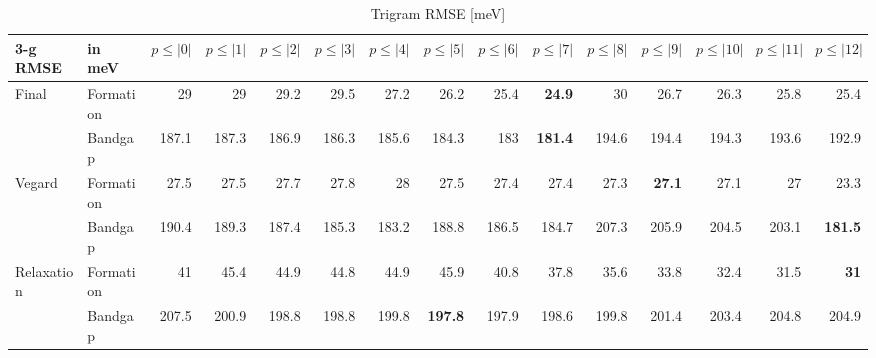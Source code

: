 \documentclass[11pt,oneside,czech,american]{book} %
\theoremstyle{definition} %
\theoremstyle{definition}
\begin{document}
\begin{table}[H]
	\scriptsize
	\centering
\begin{tabular}{llrrrrrrrrrrrrr}
	\hline
	3-g RMSE   & in meV    &   $p{\leq}|0|$ &   $p{\leq}|1|$ &   $p{\leq}|2|$ &   $p{\leq}|3|$ &   $p{\leq}|4|$ &   $p{\leq}|5|$ &   $p{\leq}|6|$ &   $p{\leq}|7|$ &   $p{\leq}|8|$ &   $p{\leq}|9|$ &   $p{\leq}|10|$ &   $p{\leq}|11|$ &   $p{\leq}|12|$ \\
	\hline
	\multirow{2}{*}{Final}      & Formation &       29   &       29   &       29.2 &       29.5 &       27.2 &       26.2 &       25.4 &       \textbf{24.9} &       30   &       26.7 &        26.3 &        25.8 &        25.4 \\
	      & Bandgap   &      187.1 &      187.3 &      186.9 &      186.3 &      185.6 &      184.3 &      183   &      \textbf{181.4} &      194.6 &      194.4 &       194.3 &       193.6 &       192.9 \\
	\multirow{2}{*}{Vegard}     & Formation &       27.5 &       27.5 &       27.7 &       27.8 &       28   &       27.5 &       27.4 &       27.4 &       27.3 &       \textbf{27.1} &        27.1 &        27   &        23.3 \\
	     & Bandgap   &      190.4 &      189.3 &      187.4 &      185.3 &      183.2 &      188.8 &      186.5 &      184.7 &      207.3 &      205.9 &       204.5 &       203.1 &       \textbf{181.5} \\
	\multirow{2}{*}{Relaxation} & Formation &       41   &       45.4 &       44.9 &       44.8 &       44.9 &       45.9 &       40.8 &       37.8 &       35.6 &       33.8 &        32.4 &        31.5 &        \textbf{31}   \\
	 & Bandgap   &      207.5 &      200.9 &      198.8 &      198.8 &      199.8 &      \textbf{197.8} &      197.9 &      198.6 &      199.8 &      201.4 &       203.4 &       204.8 &       204.9 \\
	\hline
\end{tabular}
	\caption{Trigram RMSE [meV]}
	\label{3-g RMSE hat}
\end{table}
\end{document}
